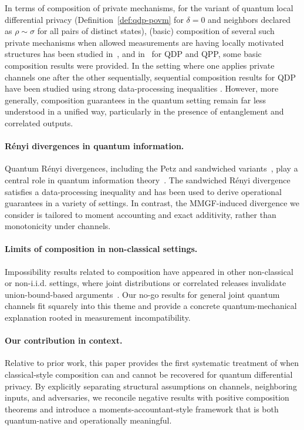 \documentclass[11pt]{article}
\theoremstyle{plain}
\theoremstyle{remark}
\begin{document}
In terms of composition of private mechanisms, for the variant of quantum local differential privacy (Definition~\ref{def:qdp-povm} for $\delta=0$ and neighbors declared as $\rho \sim \sigma$ for all pairs of distinct states), (basic) composition of several such private mechanisms when allowed measurements are having locally motivated structures has been studied in~\citep{guan2024optimal}, and in~\cite{hirche2022quantum,NuradhaGW24} for QDP and QPP, some basic composition results were provided. {In the setting where one applies private channels one after the other sequentially, sequential composition results for QDP have been studied using strong data-processing inequalities \cite{hirche2022quantum,  nuradha2025nonLinear}. 
However, more generally, composition guarantees in the quantum setting remain far less understood in a unified way, particularly in the presence of entanglement and correlated outputs.}




\paragraph{R\'enyi divergences in quantum information.}
Quantum R\'enyi divergences, including the Petz and sandwiched variants~\citep{MDSFT13,BSW15,RSB24}, play a central role in quantum information theory~\citep{DW18}.
The sandwiched R\'enyi divergence satisfies a data-processing inequality and has been used to derive operational guarantees in a variety of settings.
In contrast, the MMGF-induced divergence we consider is tailored to moment accounting and exact additivity, rather than monotonicity under channels.

\paragraph{Limits of composition in non-classical settings.}
Impossibility results related to composition have appeared in other non-classical or non-i.i.d. settings, where joint distributions or correlated releases invalidate union-bound-based arguments~\citep{KairouzOhVi17}.
Our no-go results for general joint quantum channels fit squarely into this theme and provide a concrete quantum-mechanical explanation rooted in measurement incompatibility.
\paragraph{Our contribution in context.}
Relative to prior work, this paper provides the first systematic treatment of when classical-style composition can and cannot be recovered for quantum differential privacy.
By explicitly separating structural assumptions on channels, neighboring inputs, and adversaries, we reconcile negative results with positive composition theorems and introduce a moments-accountant-style framework that is both quantum-native and operationally meaningful.
\end{document}
